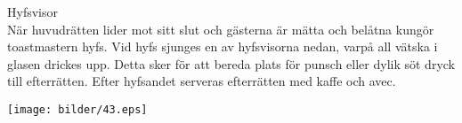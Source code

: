 \begin{flushleft}
{\Huge Hyfsvisor\\}
\vspace{1 cm}
{\Large
När huvudrätten lider mot sitt slut och gästerna är mätta och belåtna
kungör toastmastern hyfs. Vid hyfs sjunges en av
hyfsvisorna nedan, varpå all vätska i glasen drickes upp. Detta sker för att bereda plats för punsch eller dylik söt dryck till
efterrätten. Efter hyfsandet serveras efterrätten med kaffe och avec.}
\end{flushleft}

\vspace{2cm}
\begin{center}
\texttt{[image: bilder/43.eps]}
\end{center}
\newpage











